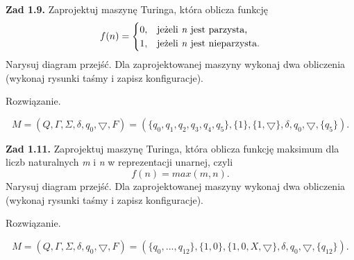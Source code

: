 \documentclass[12pt]{article}
\begin{document}
\noindent\textbf{Zad 1.9.} Zaprojektuj maszynę Turinga, która oblicza funkcję
\[f(n)=
	\begin{cases}
	0, & \text{jeżeli \textit{n} jest parzysta,} \\
	1, & \text{jeżeli \textit{n} jest nieparzysta.}
	\end{cases}
\]
Narysuj diagram przejść. Dla zaprojektowanej maszyny wykonaj dwa obliczenia (wykonaj rysunki taśmy i zapisz konfiguracje).

 Rozwiązanie.

\[M=(Q,\Gamma,\Sigma,\delta,q_0,\bigtriangledown,F)=(\{q_0,q_1,q_2,q_3,q_4,q_5\},\{1\},\{1,\bigtriangledown\},\delta,q_0,\bigtriangledown,\{q_5\}).\]

\newpage

\noindent\textbf{Zad 1.11.} Zaprojektuj maszynę Turinga, która oblicza funkcję maksimum dla liczb naturalnych \textit{m} i \textit{n} w reprezentacji unarnej, czyli
\[f(n)=max(m,n).\]
Narysuj diagram przejść. Dla zaprojektowanej maszyny wykonaj dwa obliczenia (wykonaj rysunki taśmy i zapisz konfiguracje).

 Rozwiązanie.
 
\[M=(Q,\Gamma,\Sigma,\delta,q_0,\bigtriangledown,F)=(\{q_0,...,q_{12}\},\{1,0\},\{1,0,X,\bigtriangledown\},\delta,q_0,\bigtriangledown,\{q_{12}\}).\]
\end{document}
